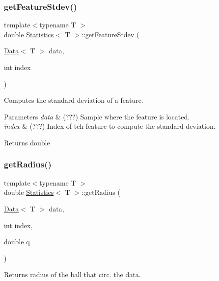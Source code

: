 \subsubsection{\texorpdfstring{get\+Feature\+Stdev()}{getFeatureStdev()}}
{\footnotesize\ttfamily template$<$typename T $>$ \\
double \hyperlink{class_statistics}{Statistics}$<$ T $>$\+::get\+Feature\+Stdev (\begin{DoxyParamCaption}\item[{\hyperlink{class_data}{Data}$<$ T $>$}]{data,  }\item[{int}]{index }\end{DoxyParamCaption})\hspace{0.3cm}{\ttfamily [static]}}



Computes the standard deviation of a feature. 


\begin{DoxyParams}{Parameters}
{\em data} & (???) Sample where the feature is located. \\
\hline
{\em index} & (???) Index of teh feature to compute the standard deviation. \\
\hline
\end{DoxyParams}
\begin{DoxyReturn}{Returns}
double 
\end{DoxyReturn}
\mbox{\label{class_statistics_a157fcc6f57bed7b0b353bff8145c5964}} 
\subsubsection{\texorpdfstring{get\+Radius()}{getRadius()}}
{\footnotesize\ttfamily template$<$typename T $>$ \\
double \hyperlink{class_statistics}{Statistics}$<$ T $>$\+::get\+Radius (\begin{DoxyParamCaption}\item[{\hyperlink{class_data}{Data}$<$ T $>$}]{data,  }\item[{int}]{index,  }\item[{double}]{q }\end{DoxyParamCaption})\hspace{0.3cm}{\ttfamily [static]}}



Returns radius of the ball that circ. the data. 



